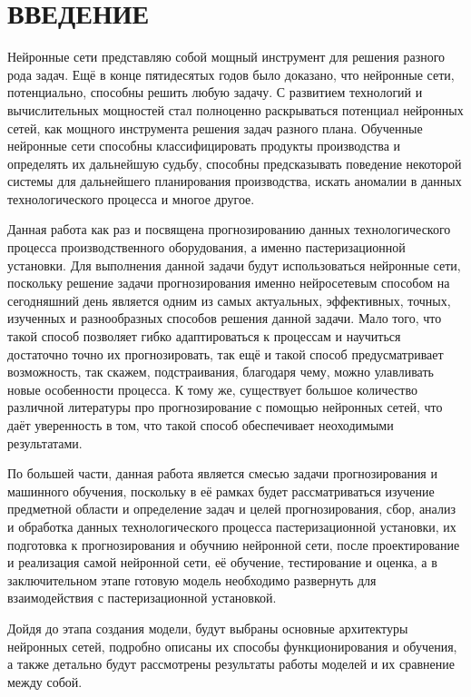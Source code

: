 \sectionbreak \section*{ 
    \cyrillicfont
    \fontsize{14pt}{24pt}\selectfont 
    \redline
    ВВЕДЕНИЕ
}
\titlespace

{\cyrillicfont
\fontsize{13pt}{16.25pt}\selectfont 
\englishfont 

\par \redline Нейронные сети представляю собой мощный инструмент для решения разного рода задач. Ещё в конце пятидесятых годов было доказано, что нейронные сети, потенциально, способны решить любую задачу. С развитием технологий и вычислительных мощностей стал полноценно раскрываться потенциал нейронных сетей, как мощного инструмента решения задач разного плана. Обученные нейронные сети способны классифицировать продукты производства и определять их дальнейшую судьбу, способны предсказывать поведение некоторой системы для дальнейшего планирования производства, искать аномалии в данных технологического процесса и многое другое. 

\par \redline Данная работа как раз и посвящена прогнозированию данных технологического процесса производственного оборудования, а именно пастеризационной установки. Для выполнения данной задачи будут использоваться нейронные сети, поскольку решение задачи прогнозирования именно нейросетевым способом на сегодняшний день является одним из самых актуальных, эффективных, точных, изученных и разнообразных способов решения данной задачи. Мало того, что такой способ позволяет гибко адаптироваться к процессам и научиться достаточно точно их прогнозировать, так ещё и такой способ предусматривает возможность, так скажем, подстраивания, благодаря чему, можно улавливать новые особенности процесса. К тому же, существует большое количество различной литературы про прогнозирование с помощью нейронных сетей, что даёт уверенность в том, что такой способ обеспечивает неоходимыми результатами. 

\par \redline По большей части, данная работа является смесью задачи прогнозирования и машинного обучения, поскольку в её рамках будет рассматриваться изучение предметной области и определение задач и целей прогнозирования, сбор, анализ и обработка данных технологического процесса пастеризационной установки, их подготовка к прогнозирования и обучнию нейронной сети, после проектирование и реализация самой нейронной сети, её обучение, тестирование и оценка, а в заключительном этапе готовую модель необходимо развернуть для взаимодействия с пастеризационной установкой.

\par \redline Дойдя до этапа создания модели, будут выбраны основные архитектуры нейронных сетей, подробно описаны их способы функционирования и обучения, а также детально будут рассмотрены результаты работы моделей и их сравнение между собой.

\par
}
